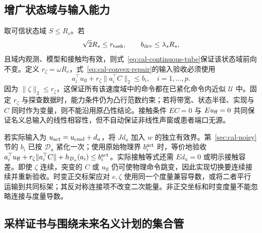 \documentclass[11pt,a4paper]{article}
\numberwithin{equation}{section}
\theoremstyle{definition}
\begin{document}
\subsection{增广状态域与输入能力}

取可信状态域 $S\le R_s$。若
\begin{equation}
 \sqrt2R_s\le r_{\mathrm{task}},\qquad
 b_{\rm drv}\le\lambda_sR_s,
 \label{eq:cal-servo-invariant}
\end{equation}
且域内观测、模型和接触均有效，则式~\eqref{eq:cal-continuous-tube}保证该状态域前向不变。定义 $r_\zeta=\omega R_s$，式~\eqref{eq:cal-convex-repair}的输入验收必须使用
\begin{equation}
 \boxed{a_i^\top u_{\mathrm{ff}}
       +r_\zeta\|a_i^\top C\|_2\le b_i,
       \quad i=1,\ldots,p.}
 \label{eq:cal-servo-capability}
\end{equation}
因为 $\|\zeta\|_2\le r_\zeta$，这保证所有该速度域中的命令都在已紧化命令内近似 $\mathcal U$ 中。固定 $r_\zeta$ 与探查数据时，能力条件仍为凸行范数约束；若将带宽、状态半径、实现与 $C$ 同时作为变量，则不能沿用原凸性结论。接触条件 $EC=0$ 与 $Eu_{\rm ff}=0$ 共同保证名义总输入的线性相容性，但不自动保证非线性声窗或患者端口无源。

若实际输入为 $u_{\rm act}=u_{\rm cmd}+d_u$，将 $Jd_u$ 加入 $w$ 的独立有效界。第~\ref{sec:cal-noisy}节的 $b_i$ 已按 $\mathcal D_u$ 紧化一次；使用原始物理界 $b_i^{\rm act}$ 时，等价地验收 $a_i^\top u_{\rm ff}+r_\zeta\|a_i^\top C\|+h_{\mathcal D_u}(a_i)\le b_i^{\rm act}$。实际接触等式还需 $Ed_u=0$ 或明示接触容差。即使 $\zeta$ 连续，突变的 $C$ 或 $u_{\mathrm{ff}}$ 仍可使物理命令跳变，因此实现切换要连续接续并重新验收。时变正交标架应对 $e,\zeta$ 使用同一个度量兼容导数，或将二者平行运输到共同标架；其反对称连接项不改变二次能量。非正交坐标和时变度量不能忽略连接与度量导数。

\subsection{采样证书与围绕未来名义计划的集合管}
\end{document}

